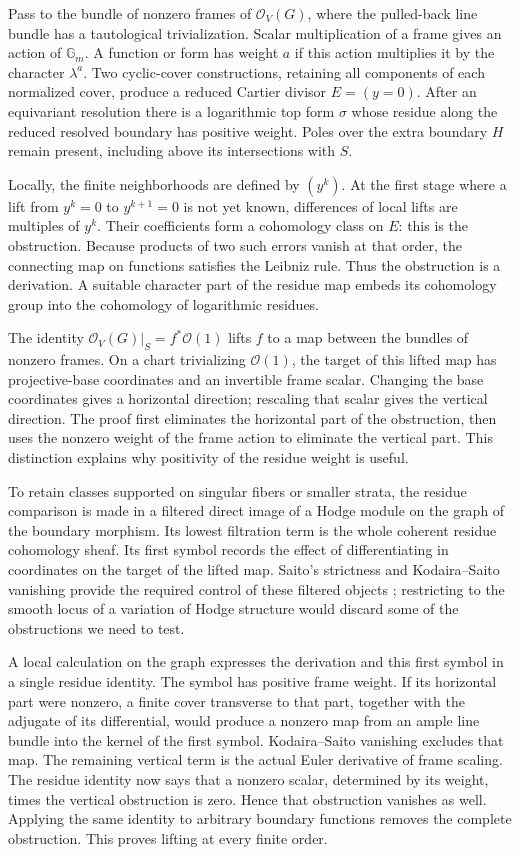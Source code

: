 Pass to the bundle of nonzero frames of $\mathcal O_V(G)$, where the
pulled-back line bundle has a tautological trivialization. Scalar
multiplication of a frame gives an action of $\mathbb G_m$. A function
or form has weight $a$ if this action multiplies it by the character
$\lambda^a$. Two cyclic-cover constructions, retaining all components
of each normalized cover, produce a reduced Cartier divisor $E=(y=0)$.
After an equivariant resolution there is a logarithmic top form $\sigma$
whose residue along the reduced resolved boundary has positive weight. Poles over the extra
boundary $H$ remain present, including above its intersections with $S$.

Locally, the finite neighborhoods are defined by $(y^k)$.
At the first stage where a lift from $y^k=0$ to $y^{k+1}=0$ is not yet
known, differences of local lifts are multiples of $y^k$. Their
coefficients form a cohomology class on $E$: this is the obstruction.
Because products of two such errors vanish at that order, the connecting
map on functions satisfies the Leibniz rule. Thus the obstruction is a
derivation. A suitable character part of the residue map embeds its
cohomology group into the cohomology of logarithmic residues.

The identity $\mathcal O_V(G)|_S=f^*\mathcal O(1)$ lifts $f$ to a
map between the bundles of nonzero frames. On a chart trivializing
$\mathcal O(1)$, the target of this lifted map has projective-base
coordinates and an invertible frame scalar. Changing the base coordinates
gives a horizontal direction; rescaling that scalar gives the vertical
direction. The proof first eliminates the
horizontal part of the obstruction, then uses the nonzero weight of the
frame action to eliminate the vertical part. This distinction explains
why positivity of the residue weight is useful.

To retain classes supported on singular fibers or smaller strata, the
residue comparison is made in a filtered direct image of a Hodge module
on the graph of the boundary morphism. Its lowest filtration term is the
whole coherent residue cohomology sheaf. Its first symbol records the
effect of differentiating in coordinates on the target of the lifted map.
Saito's strictness and
Kodaira--Saito vanishing provide the required control of these filtered
objects \cite{Saito1988,Saito1990,Popa2016}; restricting to the smooth
locus of a variation of Hodge structure would discard some of the
obstructions we need to test.

A local calculation on the graph expresses the derivation and this
first symbol in a single residue identity. The symbol has positive frame
weight. If its horizontal part were nonzero, a finite cover transverse
to that part, together with the adjugate of its differential, would
produce a nonzero map from an ample line bundle into the kernel of the
first symbol. Kodaira--Saito vanishing excludes that map. The remaining
vertical term is the actual Euler derivative of frame scaling. The
residue identity now says that a nonzero scalar, determined by its weight,
times the vertical obstruction is zero. Hence that obstruction vanishes
as well. Applying the same identity
to arbitrary boundary functions removes the complete obstruction. This
proves lifting at every finite order.

